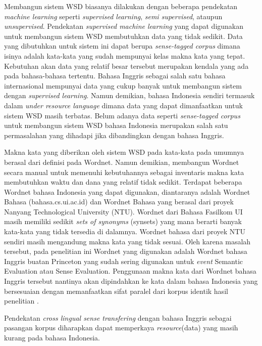 Membangun sistem WSD biasanya dilakukan dengan beberapa pendekatan \textit{machine learning} seperti \textit{supervised learning}, \textit{semi supervised}, ataupun \textit{unsupervised}. Pendekatan \textit{supervised machine learning} yang dapat digunakan untuk membangun sistem WSD membutuhkan data yang tidak sedikit. Data yang dibutuhkan untuk sistem ini dapat berupa \textit{sense-tagged corpus} dimana isinya adalah kata-kata yang sudah mempunyai kelas makna kata yang tepat. Kebutuhan akan data yang relatif besar tersebut merupakan kendala yang ada pada bahasa-bahasa tertentu. Bahasa Inggris sebagai salah satu bahasa internasional mempunyai data yang cukup banyak untuk membangun sistem dengan \textit{supervised learning}. Namun demikian, bahasa Indonesia sendiri termasuk dalam \textit{under resource language} dimana data yang dapat dimanfaatkan untuk sistem WSD masih terbatas. Belum adanya data seperti \textit{sense-tagged corpus} untuk membangun sistem WSD bahasa Indonesia merupakan salah satu permasalahan yang dihadapi jika dibandingkan dengan bahasa Inggris.

Makna kata yang diberikan oleh sistem WSD pada kata-kata pada umumnya berasal dari definisi pada Wordnet. Namun demikian, membangun Wordnet secara manual untuk memenuhi kebutuhannya sebagai inventaris makna kata membutuhkan waktu dan dana yang relatif tidak sedikit. Terdapat beberapa Wordnet bahasa Indonesia yang dapat digunakan, diantaranya adalah Wordnet Bahasa (bahasa.cs.ui.ac.id) dan Wordnet Bahasa yang berasal dari proyek Nanyang Technological University (NTU).  Wordnet dari Bahasa Fasilkom UI masih memiliki sedikit \textit{sets of synonyms} (synsets) yang mana berarti banyak kata-kata yang tidak tersedia di dalamnya. Wordnet bahasa dari proyek NTU sendiri masih mengandung makna kata yang tidak sesuai. Oleh karena masalah tersebut, pada penelitian ini Wordnet yang digunakan adalah Wordnet bahasa Inggris buatan Princeton yang sudah sering digunakan untuk \textit{event} Semantic Evaluation atau Sense Evaluation. Penggunaan makna kata dari Wordnet bahasa Inggris tersebut nantinya akan dipindahkan ke kata dalam bahasa Indonesia yang bersesuaian dengan memanfaatkan sifat paralel dari korpus identik hasil penelitian \citep{larasati2012identic}.

Pendekatan \textit{cross lingual sense transfering} dengan bahasa Inggris sebagai pasangan korpus diharapkan dapat memperkaya \textit{resource}(data) yang masih kurang pada bahasa Indonesia. 

